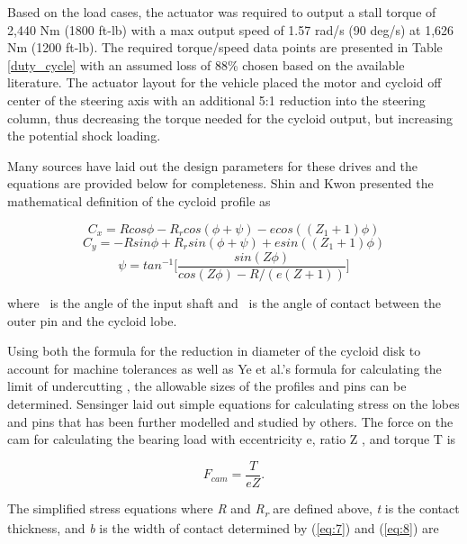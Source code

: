 Based on the load cases, the actuator was required to output a stall torque of 2,440 Nm (1800 ft-lb) with a max output speed of 1.57 rad/s (90 deg/s) at 1,626 Nm (1200 ft-lb). The required torque/speed data points are presented in Table \ref{duty_cycle} with an assumed loss of 88\% chosen based on the available literature. The actuator layout for the vehicle placed the motor and cycloid off center of the steering axis with an additional 5:1 reduction into the steering column, thus decreasing the torque needed for the cycloid output, but increasing the potential shock loading. 

Many sources have laid out the design parameters for these drives and the equations are provided below for completeness. Shin and Kwon \cite{on_the_lobe} presented the mathematical definition of the cycloid profile as

\begin{equation} \label{eq:1}
C_x = R cos\phi -R_r cos(\phi + \psi) - e cos((Z_1 + 1)\phi) 
\end{equation}
\begin{equation} \label{eq:2}
C_y = -R sin\phi + R_r sin(\phi + \psi) + e sin((Z_1 + 1)\phi) 
\end{equation}
\begin{equation} \label{eq:3}
\psi = tan^{-1} \lbrack\frac{sin(Z \phi)}{cos(Z \phi) - R / (e(Z + 1))}\rbrack 
\end{equation}

where \textphi\ is the angle of the input shaft and \textpsi\ is the angle of contact between the outer pin and the cycloid lobe. 

Using both the formula for the reduction in diameter of the cycloid disk to account for machine tolerances \cite{machine_design} \cite{design_and_application} as well as Ye et al.'s formula for calculating the limit of undercutting \cite{ye}, the allowable sizes of the profiles and pins can be determined. Sensinger \cite{unified_approach} laid out simple equations for calculating stress on the lobes and pins that has been further modelled and studied by others. The force on the cam for calculating the bearing load with eccentricity e, ratio Z , and torque T is

\begin{equation} \label{eq:4}
F_{cam} = \frac{T}{e Z}.
\end{equation}

The simplified stress equations where \textit{R} and \textit{R\textsubscript{r}} are defined above, \textit{t} is the contact thickness, and \textit{b} is the width of contact determined by (\ref{eq:7}) and (\ref{eq:8}) are

